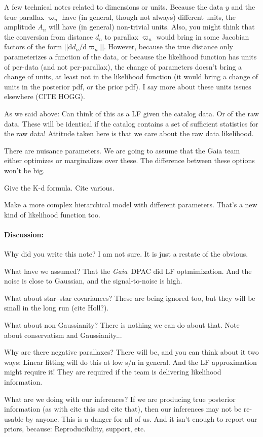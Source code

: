 \documentclass[12pt]{article}
\newcommand{\Gaia}{\textsl{Gaia}}
\newcommand{\dd}{\mathrm{d}}
\begin{document}
A few technical notes related to dimensions or units.
Because the data $y$ and
the true parallax $\varpi_n$ have (in general, though not always) different units,
the amplitude $A_n$ will have (in general) non-trivial units.
Also, you might think
that the conversion from distance $d_n$ to parallax $\varpi_n$ would bring in some
Jacobian factors of the form $||\dd d_n/\dd\varpi_n||$.
However, because the true distance only parameterizes a function of the data,
or because the likelihood function has units of per-data (and not per-parallax),
the change of parameters doesn't bring a change of units, at least not in the
likelihood function (it would bring a change of units in the posterior pdf, or the
prior pdf).
I say more about these units issues elsewhere (CITE HOGG).

As we said above: Can think of this as a LF given the catalog data. Or of the raw data.
These will be identical if the catalog contains a set of sufficient statistics
for the raw data!
Attitude taken here is that we care about the raw data likelihood.

There are nuisance parameters. We are going to assume that the Gaia team either
optimizes or marginalizes over these. The difference between these options won't
be big.

Give the K-d formula. Cite various.

Make a more complex hierarchical model with different parameters. That's
a new kind of likelihood function too.

\paragraph{Discussion:}
Why did you write this note? I am not sure. It is just a restate of the
obvious.

What have we assumed? That the \Gaia\ DPAC did LF optmimization. And the
noise is close to Gaussian, and the signal-to-noise is high.

What about star--star covariances? These are being ignored too, but they
will be small in the long run (cite Holl?).

What about non-Gaussianity? There is nothing we can do about that.
Note about conservatism and Gaussianity...

Why are there negative parallaxes? There will be, and you can think about
it two ways: Linear fitting will do this at low s/n in general. And the
LF approximation might require it!
They are required if the team is delivering likelihood information.

What are we doing with our inferences? If we are producing true posterior
information (as with cite this and cite that), then our inferences may not
be re-usable by anyone. This is a danger for all of us. And it isn't enough
to report our priors, because: Reproducibility, support, etc.
\end{document}
